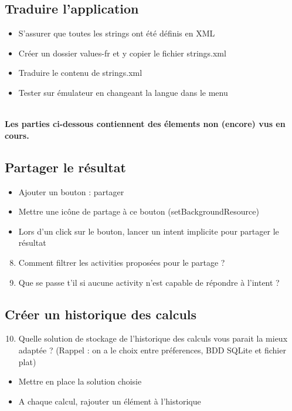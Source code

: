 \documentclass{article}
\begin{document}
\subsection{Traduire l'application}
\begin{itemize}
\item S'assurer que toutes les strings ont été définis en XML
\item Créer un dossier values-fr et y copier le fichier strings.xml
\item Traduire le contenu de strings.xml
\item Tester sur émulateur en changeant la langue dans le menu
\end{itemize}
\\\*
\textbf{Les parties ci-dessous contiennent des élements non (encore) vus en cours.}
\subsection{Partager le résultat}
\begin{itemize}
\item Ajouter un bouton : partager
\item Mettre une icône de partage à ce bouton (setBackgroundResource)
\item Lors d'un click sur le bouton, lancer un intent implicite pour partager le résultat
\end{itemize}
\begin{enumerate}
 \setcounter{enumi}{7}
\item Comment filtrer les activities proposées pour le partage ?
\item Que se passe t'il si aucune activity n'est capable de répondre à l'intent ?
\end{enumerate}
\subsection{Créer un historique des calculs}
\begin{enumerate}
 \setcounter{enumi}{9}
\item Quelle solution de stockage de l'historique des calculs vous parait la mieux adaptée ? (Rappel : on a le choix entre préferences, BDD SQLite et fichier plat) 
\end{enumerate}
\begin{itemize}
\item Mettre en place la solution choisie
\item A chaque calcul, rajouter un élément à l'historique
\end{itemize}
\end{document}

